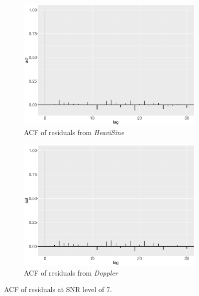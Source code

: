 \begin{figure}[!ht]
    \begin{subfigure}{0.45\textwidth}
    \centering
    \includegraphics[width=\textwidth]{Chapters/02TractorSplineTheory/plot/ggplot/ggacfHeavi7.pdf}
    \caption{ACF of residuals from \textit{HeaviSine} }
    \end{subfigure}
    \begin{subfigure}{0.45\textwidth}
    \centering
    \includegraphics[width=\textwidth]{Chapters/02TractorSplineTheory/plot/ggplot/ggacfDoppler7.pdf}
    \caption{ACF of residuals from \textit{Doppler}}
    \end{subfigure}
\caption{ACF of residuals at SNR level of 7.}\label{tractorsplineSNR7acf}
 \end{figure}
